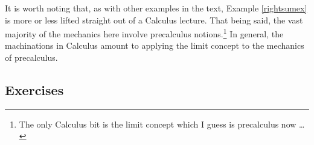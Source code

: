 \documentclass{ximera}
\begin{document}
It is worth noting that, as with other examples in the text,  Example \ref{rightsumex} is more or less lifted straight out of  a Calculus lecture.  That being said, the vast majority of the mechanics here involve precalculus notions.\footnote{The only Calculus bit is the limit concept which I guess is precalculus now \ldots}   In general, the machinations in Calculus amount to applying the limit concept to the mechanics of precalculus.  

\newpage

\subsection{Exercises}



\closegraphsfile
\end{document}
